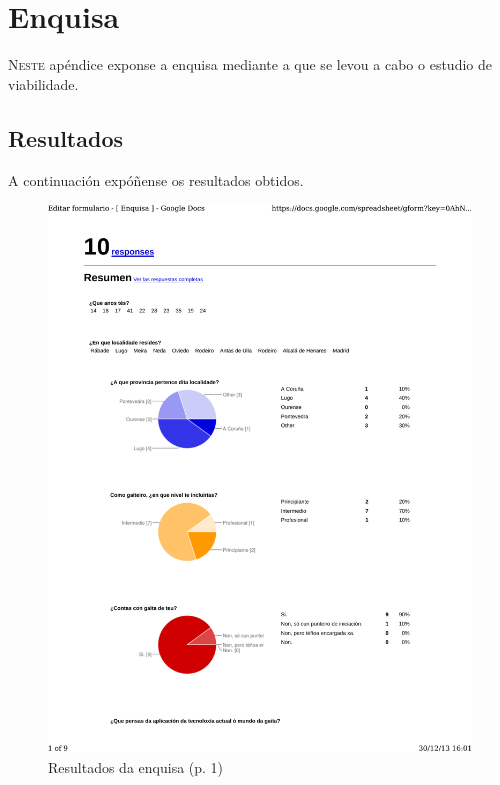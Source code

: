 \chapter{Enquisa}
\label{chap:encuesta}


\lettrine{N}{este} apéndice exponse a enquisa mediante a que se levou a cabo o
estudio de viabilidade.

\section{Resultados}

A continuación expóñense os resultados obtidos.

\begin{figure}
 \centering
 \includegraphics[scale=0.7,page=1,keepaspectratio=true]{./imagenes/enquisa.pdf}
 \caption{Resultados da enquisa (p. 1)}
 \label{figura:ResultadosEnquisa1}
\end{figure}

